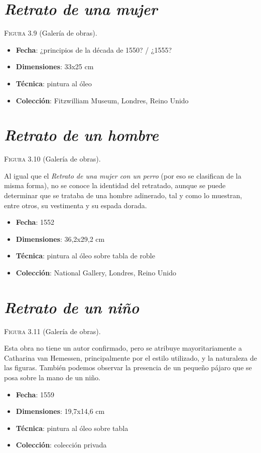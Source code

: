 \documentclass[12pt]{book}
\begin{document}
\section{\textit{Retrato de una mujer}}

\textsc{Figura 3.9} (Galería de obras).\bigskip

\begin{itemize}
	\item \textbf{Fecha}: ¿principios de la década de 1550? / ¿1555?
	\item \textbf{Dimensiones}: 33x25 cm
	\item \textbf{Técnica}: pintura al óleo
	\item \textbf{Colección}: Fitzwilliam Museum, Londres, Reino Unido
\end{itemize}

\section{\textit{Retrato de un hombre}}

\textsc{Figura 3.10} (Galería de obras).\bigskip

Al igual que el \textit{Retrato de una mujer con un perro} (por eso se clasifican de la misma forma), no se conoce la identidad del retratado, aunque se puede determinar que se trataba de una hombre adinerado, tal y como lo muestran, entre otros, su vestimenta y su espada dorada.
\begin{itemize}
	\item \textbf{Fecha}: 1552
	\item \textbf{Dimensiones}: 36,2x29,2 cm
	\item \textbf{Técnica}: pintura al óleo sobre tabla de roble
	\item \textbf{Colección}: National Gallery, Londres, Reino Unido
\end{itemize}

\section{\textit{Retrato de un niño}}

\textsc{Figura 3.11} (Galería de obras).\bigskip

Esta obra no tiene un autor confirmado, pero se atribuye mayoritariamente a Catharina van Hemessen, principalmente por el estilo utilizado, y la naturaleza de las figuras. También podemos observar la presencia de un pequeño pájaro que se posa sobre la mano de un niño.
\begin{itemize}
	\item \textbf{Fecha}: 1559
	\item \textbf{Dimensiones}: 19,7x14,6 cm
	\item \textbf{Técnica}: pintura al óleo sobre tabla
	\item \textbf{Colección}: colección privada
\end{itemize}
\end{document}
